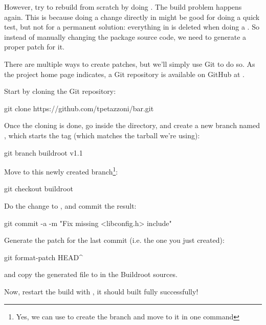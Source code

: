 However, try to rebuild  from scratch by doing . The build problem happens again. This is because
doing a change directly in  might be good for
doing a quick test, but not for a permanent solution: everything in
 is deleted when doing a . So instead of
manually changing the package source code, we need to generate a
proper patch for it.

There are multiple ways to create patches, but we'll simply use Git to
do so. As the  project home page indicates, a Git repository
is available on GitHub at .

Start by cloning the Git repository:

\begin{bashinput}
git clone https://github.com/tpetazzoni/bar.git
\end{bashinput}

Once the cloning is done, go inside the  directory, and
create a new branch named , which starts the
 tag (which matches the  tarball we're
using):

\begin{bashinput}
git branch buildroot v1.1
\end{bashinput}

Move to this newly created branch\footnote{Yes, we can use  to create the branch and move to it in one command}:

\begin{bashinput}
git checkout buildroot
\end{bashinput}

Do the  change to , and
commit the result:

\begin{bashinput}
git commit -a -m "Fix missing <libconfig.h> include"
\end{bashinput}

Generate the patch for the last commit (i.e. the one you just created):

\begin{bashinput}
git format-patch HEAD^
\end{bashinput}

and copy the generated  file to 
in the Buildroot sources.

Now, restart the build with , it should
built fully successfully!

